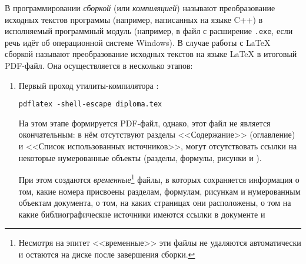\documentclass[a4paper, 14pt, reqno, oneside]{extbook}
\begin{document}
В программировании \emph{сборкой} (или \emph{компиляцией}) называют преобразование исходных текстов программы (например, написанных на языке C++) в исполняемый программный модуль (например, в файл с расширение \texttt{.exe}, если речь идёт об операционной системе Windows). В случае работы с \LaTeX\xspace сборкой называют преобразование исходных текстов на языке \LaTeX\xspace в итоговый PDF-файл. Она осуществляется в несколько этапов:
\begin{enumerate}
\item Первый проход утилиты-компилятора \verb@pdflatex@:
\begin{verbatim}
pdflatex -shell-escape diploma.tex
\end{verbatim}
    На этом этапе формируется PDF-файл, однако, этот файл не является окончательным: в нём отсутствуют разделы <<Содержание>> (оглавление) и <<Список использованных источников>>, могут отсутствовать ссылки на некоторые нумерованные объекты (разделы, формулы, рисунки и \dr).
    
    При этом создаются \emph{временные}\footnote{Несмотря на эпитет <<временные>> эти файлы не удаляются автоматически и остаются на диске после завершения сборки.} файлы, в которых сохраняется информация о том, какие номера присвоены разделам, формулам, рисункам и \dr нумерованным объектам документа, о том, на каких страницах они расположены, о том на какие библиографические источники имеются ссылки в документе и \td
    

\end{enumerate}
\end{document}
